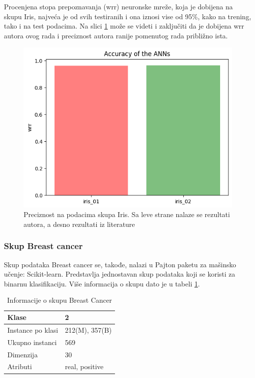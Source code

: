 \documentclass[a4paper]{article}
\begin{document}
{Procenjena stopa prepoznavanja (wrr) neuronske mreže, koja je dobijena na skupu Iris, najveća je od svih testiranih i ona iznosi vise od 95\%, 
kako na trening, tako i na test podacima. Na slici \ref{fig:irisslika} može se videti i zaključiti da je dobijena wrr autora ovog rada i preciznost 
autora ranije pomenutog rada \cite{hindawi} približno ista.

\begin{figure}[h!]
\centering
\captionsetup{justification=centering,margin=2cm}
\begin{center}
\includegraphics[scale=0.4]{img/iriswrr.png}
\end{center}
\caption{Preciznost na podacima skupa Iris. Sa leve strane nalaze se rezultati autora, a desno rezultati iz literature \cite{hindawi} }
\label{fig:irisslika}
\end{figure}

\subsubsection{Skup Breast cancer}
\label{breast}

Skup podataka Breast cancer se, takođe, nalazi u Pajton paketu za mašinsko učenje: Scikit-learn. Predstavlja jednostavan skup 
podataka koji se koristi za binarnu klasifikaciju. Više informacija o skupu dato je u tabeli \ref{table_bc}.

\begin{table}[h!]
\begin{center}
\caption{Informacije o skupu Breast Cancer}
\begin{tabular}{|p{4cm}|p{2cm}|}
\hline
Klase             & 2              \\ \hline
Instance po klasi & 212(M), 357(B) \\ \hline
Ukupno instanci   & 569            \\ \hline
Dimenzija         & 30             \\ \hline
Atributi          & real, positive \\ \hline
\end{tabular}\par
\label{table_bc}
\bigskip
\end{center} 
\end{table}

}
\end{document}
